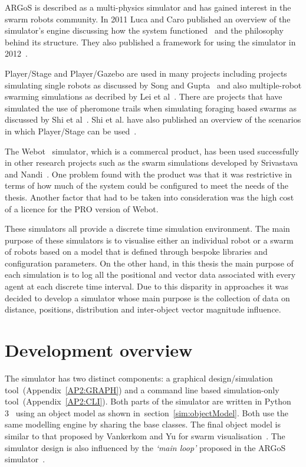 ARGoS is described as a multi-physics simulator and has gained interest in the swarm robots community. In 2011 Luca and Caro published an overview of the simulator's engine discussing how the system functioned~\cite{PTOPB:11} and the philosophy behind its structure. They also published a framework for using the simulator in 2012~\cite{KCGD:12}. 

Player/Stage and Player/Gazebo are used in many projects including projects simulating single robots as discussed by Song and Gupta~\cite{SG:15} and also multiple-robot swarming simulations as decribed by Lei et al~\cite{LLZ:08}. There are projects that have simulated the use of pheromone trails when simulating foraging based swarms as discussed by Shi et al~\cite{STZZW:13}. Shi et al. have also published an overview of the scenarios in which Player/Stage can be used~\cite{STWZZ:11}.

The Webot~\cite{CL:16} simulator, which is a commercal product, has been used successfully in other research projects such as the swarm simulations developed by Srivastava and Nandi~\cite{SN:10}. One problem found with the product was that it was restrictive in terms of how much of the system could be configured to meet the needs of the thesis. Another factor that had to be taken into consideration was the high cost of a licence for the PRO version of Webot.

These simulators all provide a discrete time simulation environment. The main purpose of these simulators is to visualise either an individual robot or a swarm of robots based on a model that is defined through bespoke libraries and configuration parameters. On the other hand, in this thesis the main purpose of each simulation is to log all the positional and vector data associated with every agent at each discrete time interval. Due to this disparity in approaches it was decided to develop a simulator whose main purpose is the collection of data on distance, positions, distribution and inter-object vector magnitude influence. 

\section{Development overview}\label{sim:intro}
The simulator has two distinct components: a graphical design/simulation tool~(Appendix~\ref{AP2:GRAPH}) and a command line based simulation-only tool~(Appendix~\ref{AP2:CLI}). Both parts of the simulator are written in Python 3~\cite{PYTHON3:15} using an object model as shown in~section~\ref{sim:objectModel}. Both use the same modelling engine by sharing the base classes.  The final object model is similar to that proposed by Vankerkom and Yu for swarm visualisation~\cite{VY:04}. The simulator design is also influenced by the \textit{`main loop'} proposed in the ARGoS simulator~\cite{PTOPB:11}.


